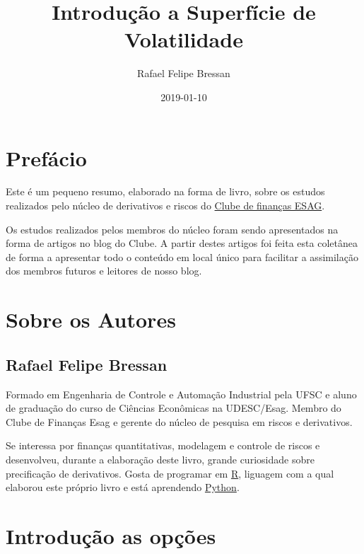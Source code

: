 \documentclass[]{book}
\title{Introdução a Superfície de Volatilidade}
\author{Rafael Felipe Bressan}
\date{2019-01-10}
\begin{document}
\maketitle

{
\setcounter{tocdepth}{1}
\tableofcontents
}
\chapter*{Prefácio}\label{prefacio}

Este é um pequeno resumo, elaborado na forma de livro, sobre os estudos
realizados pelo núcleo de derivativos e riscos do
\href{https://clubedefinancas.com.br}{Clube de finanças ESAG}.

Os estudos realizados pelos membros do núcleo foram sendo apresentados
na forma de artigos no blog do Clube. A partir destes artigos foi feita
esta coletânea de forma a apresentar todo o conteúdo em local único para
facilitar a assimilação dos membros futuros e leitores de nosso blog.

\chapter*{Sobre os Autores}\label{sobre-os-autores}

\section*{Rafael Felipe Bressan}\label{rafael-felipe-bressan}

Formado em Engenharia de Controle e Automação Industrial pela UFSC e
aluno de graduação do curso de Ciências Econômicas na UDESC/Esag. Membro
do Clube de Finanças Esag e gerente do núcleo de pesquisa em riscos e
derivativos.

Se interessa por finanças quantitativas, modelagem e controle de riscos
e desenvolveu, durante a elaboração deste livro, grande curiosidade
sobre precificação de derivativos. Gosta de programar em
\href{https://cran.r-project.org/}{R}, liguagem com a qual elaborou este
próprio livro e está aprendendo \href{https://www.python.org/}{Python}.

\chapter{Introdução as opções}\label{opcoes}
\end{document}
